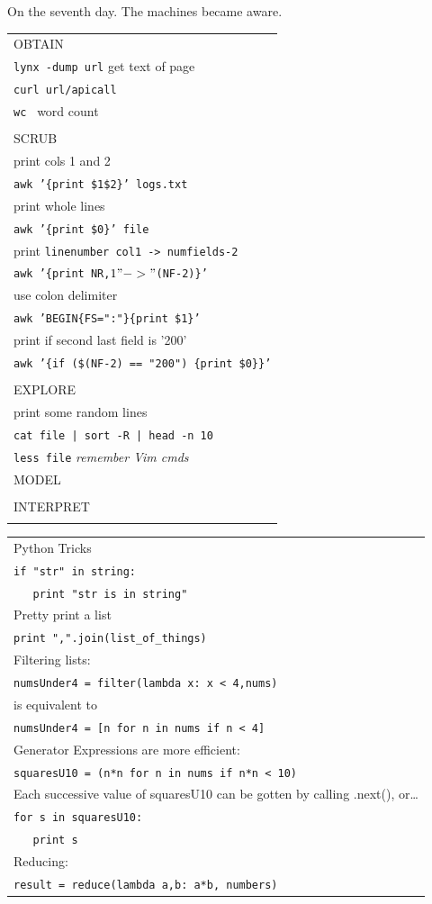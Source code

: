 \documentclass[a4paper,12pt]{article}
\begin{document}
\begin{multicols}{2}
\clearpage
On the seventh day. The machines became aware.
\begin{tabular}{l}
OBTAIN\\
\texttt{lynx -dump url} get text of page\\
\texttt{curl url/apicall}\\
\texttt{wc } word count\\
\\
SCRUB\\
print cols 1 and 2\\
\texttt{awk '\{print \$1\$2\}' logs.txt}\\
print whole lines\\
\texttt{awk '\{print \$0\}' file}\\
print \texttt{linenumber col1 -> numfields-2}\\
\texttt{awk '\{print NR,$1 " -> " $(NF-2)\}'}\\
use colon delimiter\\
\texttt{awk 'BEGIN\{FS=":"\}\{print \$1\}'}\\
print if second last field is '200'\\
\texttt{awk '\{if (\$(NF-2) == "200") \{print \$0\}\}'}\\
\\
EXPLORE\\
print some random lines\\
\texttt{cat file | sort -R | head -n 10}\\
\texttt{less file} \emph{remember Vim cmds}\\
MODEL\\
\\
INTERPRET\\
\\ \end{tabular} 
\begin{tabular}{l}
Python Tricks\\
\texttt{if "str" in string:}\\
\texttt{\ \ \  print "str is in string"}\\
Pretty print a list\\
\texttt{print ",".join(list\_of\_things)}\\
Filtering lists:\\
\texttt{numsUnder4 = filter(lambda x: x < 4,nums)}\\
is equivalent to\\
\texttt{numsUnder4 = [n for n in nums if n < 4]}\\
Generator Expressions are more efficient:\\
\texttt{squaresU10 = (n*n for n in nums if n*n < 10)}\\
Each successive value of squaresU10 can be gotten by calling .next(), or\ldots\\
\texttt{for s in squaresU10:}\\
\texttt{\ \ \  print s}\\
Reducing:\\
\texttt{result = reduce(lambda a,b: a*b, numbers)}\\


\end{tabular}
\end{multicols}
\end{document}
